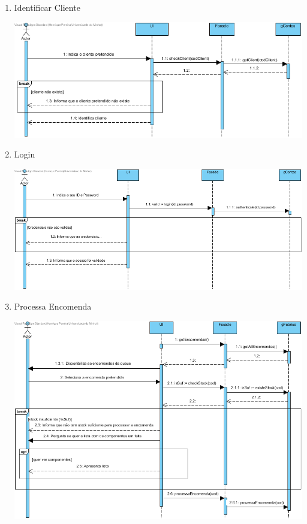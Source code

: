 \documentclass[11pt]{article} %
\begin{document}
\begin{enumerate}
\begin{center}
		\end{center}
	\item Identificar Cliente
		\begin{center}
 			\includegraphics[width = 6in]{dsss_identificar_cliente.png}
		\end{center}
	\item Login
		\begin{center}
 			\includegraphics[width = 6in]{dsss_login.png}
		\end{center}
	\item Processa Encomenda
		\begin{center}
 			\includegraphics[width = 6in]{dsss_processa_encomenda.png}

\end{center}
\end{enumerate}
\end{document}
